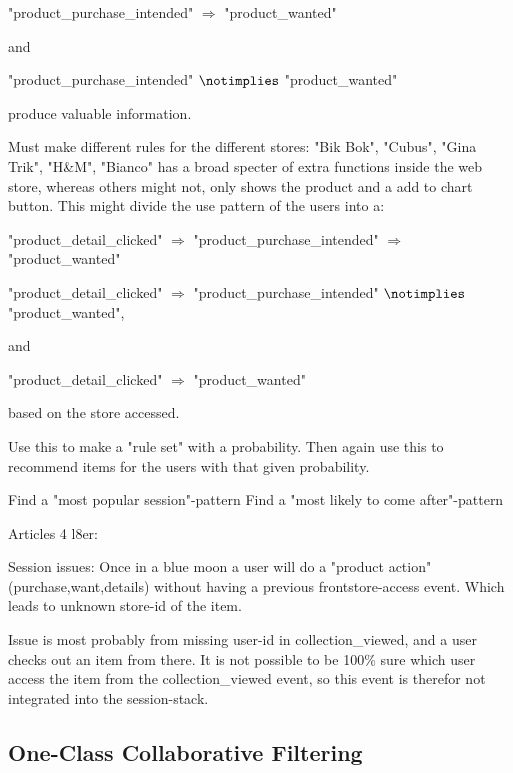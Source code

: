 "product\_purchase\_intended" $\Rightarrow$ "product\_wanted"

and

"product\_purchase\_intended" $\notimplies$ "product\_wanted"

produce valuable information.

Must make different rules for the different stores:
"Bik Bok", "Cubus", "Gina Trik", "H\&M", "Bianco" has a broad specter of extra
functions inside the web store, whereas others might not, only shows the
product and a add to chart button.  This might divide the use pattern of the
users into a:

"product\_detail\_clicked" $\Rightarrow$ "product\_purchase\_intended" $\Rightarrow$ "product\_wanted"

"product\_detail\_clicked" $\Rightarrow$ "product\_purchase\_intended" $\notimplies$ "product\_wanted",

and

"product\_detail\_clicked" $\Rightarrow$ "product\_wanted"

based on the store accessed.

Use this to make a "rule set" with a probability.
Then again use this to recommend items for the users with that given
probability.

Find a "most popular session"-pattern
Find a "most likely to come after"-pattern

Articles 4 l8er:

Session issues:
Once in a blue moon a user will do a "product action" (purchase,want,details)
without having a previous frontstore-access event. Which leads to unknown
store-id of the item.

Issue is most probably from missing user-id in collection\_viewed, and a user
checks out an item from there. It is not possible to be 100\% sure which user
access the item from the collection\_viewed event, so this event is therefor
not integrated into the session-stack.

\subsection{One-Class Collaborative Filtering}
